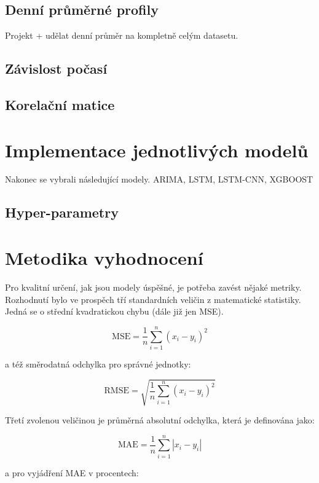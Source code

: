 \documentclass[FM,BP,fonts]{tulthesis}
\begin{document}
\subsection{Denní průměrné profily}
Projekt + udělat denní průměr na kompletně celým datasetu.
\subsection{Závislost počasí}
\subsection{Korelační matice}


\newpage

\section{Implementace jednotlivých modelů}
Nakonec se vybrali následující modely. ARIMA, LSTM, LSTM-CNN, XGBOOST

\subsection{Hyper-parametry}

\newpage
\section{Metodika vyhodnocení}\label{section:error-matrix}
Pro kvalitní určení, jak jsou modely úspěšné, je potřeba zavést nějaké metriky. Rozhodnutí bylo ve prospěch tří standardních veličin z matematické statistiky. Jedná se o střední kvadratickou chybu (dále již jen MSE). 

\begin{equation}
	\text{MSE} = \frac{1}{n}\sum_{i=1}^{n}(x_i-y_i)^2 
\end{equation}

a též směrodatná odchylka pro správné jednotky:

\begin{equation}
	\text{RMSE} = \sqrt{\frac{1}{n}\sum_{i=1}^{n}(x_i-y_i)^2}
\end{equation}

Třetí zvolenou veličinou je průměrná absolutní odchylka, která je definována jako:

\begin{equation}
	\text{MAE} = \frac{1}{n}\sum_{i=1}^{n}|x_i-y_i| 
\end{equation}

a pro vyjádření MAE v procentech: 
\end{document}
